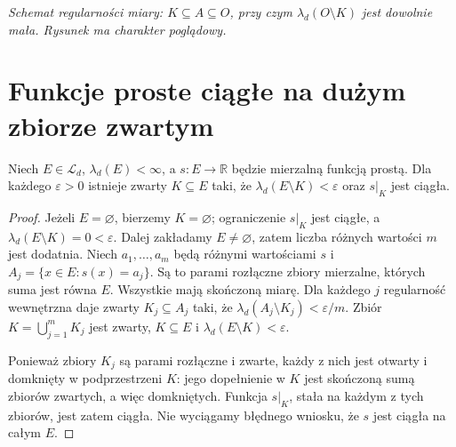 \begin{center}
\par\smallskip
\textit{Schemat regularności miary: $K\subseteq A\subseteq O$,
przy czym $\lambda_d(O\setminus K)$ jest dowolnie mała.
Rysunek ma charakter poglądowy.}
\end{center}

\section{Funkcje proste ciągłe na dużym zbiorze zwartym}

\begin{lemat}
\label{lem:lusin-simple-10}
Niech $E\in\mathcal L_d$, $\lambda_d(E)<\infty$,
a $s:E\to\mathbb R$ będzie mierzalną funkcją prostą.
Dla każdego $\varepsilon>0$ istnieje zwarty
$K\subseteq E$ taki, że
$\lambda_d(E\setminus K)<\varepsilon$ oraz
$s|_K$ jest ciągła.
\end{lemat}
\begin{proof}
Jeżeli $E=\varnothing$, bierzemy $K=\varnothing$;
ograniczenie $s|_K$ jest ciągłe, a
$\lambda_d(E\setminus K)=0<\varepsilon$.
Dalej zakładamy $E\ne\varnothing$, zatem liczba
różnych wartości $m$ jest dodatnia.
Niech $a_1,\dots,a_m$ będą różnymi wartościami $s$
i $A_j=\{x\in E:s(x)=a_j\}$.
Są to parami rozłączne zbiory mierzalne, których
suma jest równa $E$. Wszystkie mają skończoną miarę.
Dla każdego $j$ regularność wewnętrzna daje
zwarty $K_j\subseteq A_j$ taki, że
$\lambda_d(A_j\setminus K_j)<\varepsilon/m$.
Zbiór $K=\bigcup_{j=1}^mK_j$ jest zwarty,
$K\subseteq E$ i
$\lambda_d(E\setminus K)<\varepsilon$.

Ponieważ zbiory $K_j$ są parami rozłączne i zwarte,
każdy z nich jest otwarty i domknięty w podprzestrzeni
$K$: jego dopełnienie w $K$ jest skończoną sumą
zbiorów zwartych, a więc domkniętych.
Funkcja $s|_K$, stała na każdym z tych zbiorów,
jest zatem ciągła. Nie wyciągamy błędnego wniosku,
że $s$ jest ciągła na całym $E$.
\end{proof}

